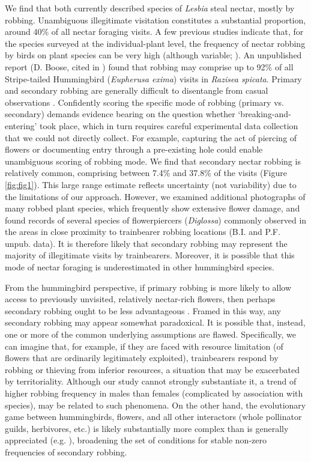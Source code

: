 \documentclass[fleqn,10pt,lineno]{wlpeerj}
\begin{document}
%
%
We find that both currently described species of \textit{Lesbia} steal nectar, mostly by robbing. 
Unambiguous illegitimate visitation constitutes a substantial proportion, around 40\% of all nectar foraging visits. 
A few previous studies indicate that, for the species surveyed at the individual-plant level, the frequency of nectar robbing by birds on plant species can be very high (although variable; \citealt{arizmendi2001}). 
An unpublished report (D. Boose, cited in \citealt{maloof2000}) found that robbing may comprise up to 92\% of all Stripe-tailed Hummingbird (\textit{Eupherusa exima}) visits in \textit{Razisea spicata}.
Primary and secondary robbing are generally difficult to disentangle from casual observations \citep{vogt2006,boehm2018}. 
Confidently scoring the specific mode of robbing (primary vs. secondary) demands evidence bearing on the question whether `breaking-and-entering' took place, which  in turn requires careful experimental data collection that we could not directly collect.
For example, capturing the act of piercing of flowers or documenting entry through a pre-existing hole could enable unambiguous scoring of robbing mode.
We find that secondary nectar robbing is relatively common, comprising between 7.4\% and 37.8\% of the visits (Figure \ref{fig:fig1}).
This large range estimate reflects uncertainty (not variability) due to the limitations of our approach.
However, we examined additional photographs of many robbed plant species, which frequently show extensive flower damage, and found records of several species of flowerpiercers (\textit{Diglossa}) commonly observed in the areas in close proximity to trainbearer robbing locations (B.I. and P.F. unpub. data).
It is therefore likely that secondary robbing may represent the majority of illegitimate visits by trainbearers. Moreover, it is possible that this mode of nectar foraging is underestimated  in other hummingbird species.

%
%
From the hummingbird perspective, if primary robbing is more likely to allow access to previously unvisited, relatively nectar-rich flowers, then perhaps secondary robbing ought to be less advantageous \citep{irwin2010}.  
Framed in this way, any secondary robbing may appear somewhat paradoxical. 
It is possible that, instead, one or more of the common underlying assumptions are flawed. 
Specifically, we can imagine that, for example, if they are faced with resource limitation (of flowers that are ordinarily legitimately exploited), trainbearers respond by robbing or thieving from inferior resources, a situation that may be exacerbated by territoriality. 
Although our study cannot strongly substantiate it, a trend of higher robbing frequency in males than females (complicated by association with species), may be related to such phenomena.
On the other hand, the evolutionary game between hummingbirds, flowers, and all other interactors (whole pollinator guilds, herbivores, etc.) is likely substantially more complex than is generally appreciated (e.g. \citealt{maloof2000}), broadening the set of conditions for stable non-zero frequencies of secondary robbing.
\end{document}
